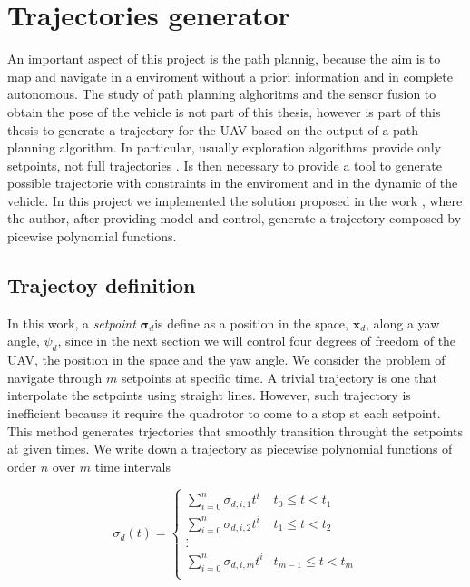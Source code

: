 \chapter{Trajectories generator}
\label{trajectoriesGenerator}

An important aspect of this project is the path plannig, because the aim is to map and navigate in a enviroment without a priori information and in complete autonomous. The study of path planning alghoritms and the sensor fusion to obtain the pose of the vehicle is not part of this thesis, however is part of this thesis to generate a trajectory for the UAV based on the output of a path planning algorithm. In particular, usually exploration algorithms provide only setpoints, not full trajectories \cite{potentialField} \cite{visionBasedMAV}. Is then necessary to provide a tool to generate possible trajectorie with constraints in the enviroment and in the dynamic of the vehicle. In this project we implemented the solution proposed in the work \cite{minimumSnap}, where the author, after providing model and control, generate a trajectory composed by picewise polynomial functions.


\section{Trajectoy definition}
\label{trajDefinition}

In this work, a \textit{setpoint} $\boldsymbol{\sigma}_d$is define as a position in the space, $\mathbf{x}_d$, along a yaw angle, $\psi_d$, since in the next section we will control four degrees of freedom of the UAV, the position in the space and the yaw angle. We consider the problem of navigate through $m$ setpoints at specific time. A trivial trajectory is one that interpolate the setpoints using straight lines. However, such trajectory is inefficient because it require the quadrotor to come to a stop st each setpoint. This method generates trjectories that smoothly transition throught the setpoints at given times. We write down a trajectory as piecewise polynomial functions of order $n$ over $m$ time intervals

\begin{equation}
	\sigma_d(t)=
	\begin{cases}
		\sum\limits_{i=0}^{n}\sigma_{d,i,1}t^i & t_0 \le t < t_1 \\
		\sum\limits_{i=0}^{n}\sigma_{d,i,2}t^i & t_1 \le t < t_2 \\
		\vdots \\
		\sum\limits_{i=0}^{n}\sigma_{d,i,m}t^i & t_{m-1} \le t < t_m \\
	\end{cases}
	\label{eq:defTraj}
\end{equation}

